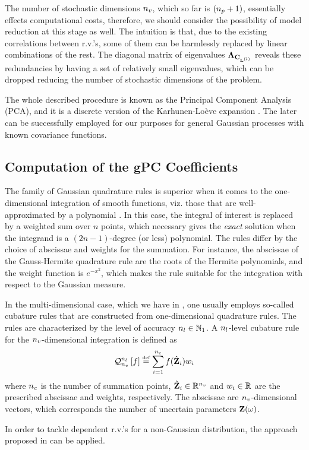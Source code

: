 The number of stochastic dimensions ${n_v}$, which so far is $({n_p} + 1)$, essentially effects computational costs, therefore, we should consider the possibility of model reduction at this stage as well. The intuition is that, due to the existing correlations between r.v.'s, some of them can be harmlessly replaced by linear combinations of the rest. The diagonal matrix of eigenvalues $\m{\Lambda}_{\mCov_\vlLeff}$ reveals these redundancies by having a set of relatively small eigenvalues, which can be dropped reducing the number of stochastic dimensions of the problem.

The whole described procedure is known as the Principal Component Analysis (PCA), and it is a discrete version of the Karhunen-Lo\`{e}ve expansion \cite{loeve1978}. The later can be successfully employed for our purposes for general Gaussian processes with known covariance functions.

\subsection{Computation of the gPC Coefficients} 
The family of Gaussian quadrature rules is superior when it comes to the one-dimensional integration of smooth functions, viz. those that are well-approximated by a polynomial \cite{press2007}. In this case, the integral of interest is replaced by a weighted sum over $n$ points, which necessary gives the \emph{exact} solution when the integrand is a $(2n - 1)$-degree (or less) polynomial. The rules differ by the choice of abscissae and weights for the summation. For instance, the abscissae of the Gauss-Hermite quadrature rule are the roots of the Hermite polynomials, and the weight function is $e^{-x^2}$, which makes the rule suitable for the integration with respect to the Gaussian measure.

In the multi-dimensional case, which we have in , one usually employs so-called cubature rules that are constructed from one-dimensional quadrature rules. The rules are characterized by the level of accuracy ${n_l} \in \mathbb{N}_{1}$. A ${n_l}$-level cubature rule for the ${n_v}$-dimensional integration is defined as
\[
  \mathcal{Q}_{{n_v}}^{{n_l}}\left[f\right] \stackrel{\text{\tiny def}}{=} \sum_{i = 1}^{{n_c}} f(\hat{\mathbf{Z}}_i) w_i
\]
where ${n_c}$ is the number of summation points, $\hat{\mathbf{Z}}_i \in \mathbb{R}^{n_v}$ and $w_i \in \mathbb{R}$ are the prescribed abscissae and weights, respectively. The abscissae are ${n_v}$-dimensional vectors, which corresponds the number of uncertain parameters $\mathbf{Z}(\omega)$.

In order to tackle dependent r.v.'s for a non-Gaussian distribution, the approach proposed in \cite{babuska2010} can be applied.
